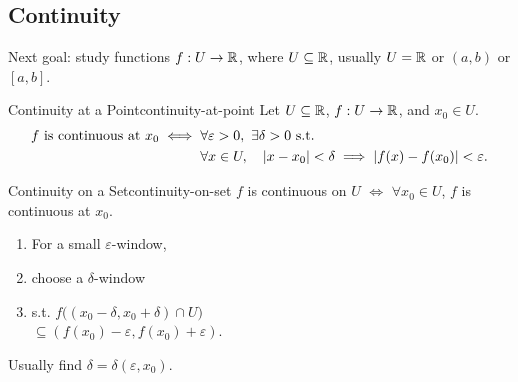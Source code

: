 \subsection{Continuity}

Next goal: study functions $f:U\to\mathbb{R}$, where $U\subseteq\mathbb{R}$,
usually $U=\mathbb{R}$ or $(a,b)$ or $[a,b]$.

\begin{definition}{Continuity at a Point}{continuity-at-point}
  Let $U\subseteq\mathbb{R}$, $f:U\to\mathbb{R}$, and $x_0\in U$.
  \[
    \begin{aligned}
      f\text{ is continuous at }x_0
      \iff{} & \forall\varepsilon>0,\ \exists\delta>0\text{ s.t.} \\
             & \forall x\in U,\quad \left\lvert x-x_0 \right\rvert<\delta
      \implies\left\lvert f(x)-f(x_0) \right\rvert<\varepsilon.
    \end{aligned}
  \]
\end{definition}

\begin{definition}{Continuity on a Set}{continuity-on-set}
  $f$ is continuous on $U$ $\iff$ $\forall x_0\in U$, $f$ is continuous at $x_0$.
\end{definition}

\begin{thinking}
  \begin{minipage}[c]{0.47\linewidth}
    \centering
  \end{minipage}
  \hfill
  \begin{minipage}[c]{0.51\linewidth}
    \begin{enumerate}[leftmargin=*]
      \item For a small $\varepsilon$-window,
      \item choose a $\delta$-window
      \item s.t. $f\bigl((x_0-\delta,x_0+\delta)\cap U\bigr)$\\
            $\subseteq(f(x_0)-\varepsilon,f(x_0)+\varepsilon)$.
    \end{enumerate}
    Usually find $\delta=\delta(\varepsilon,x_0)$.
  \end{minipage}
\end{thinking}

